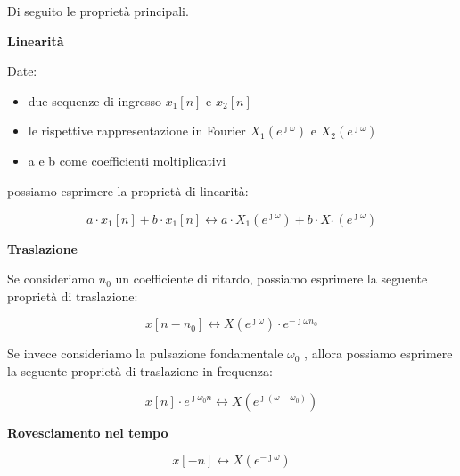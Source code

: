 Di seguito le proprietà principali. \newline 

\textbf{Linearità} \newline

Date: 

\begin{itemize}
    \item due sequenze di ingresso $x_1 \left[ n\right]$ e $x_2 \left[ n\right]$ 
    \item le rispettive rappresentazione in Fourier $X_1 \left(e^{\jmath \omega}\right)$ e $X_2 \left(e^{\jmath \omega}\right)$ 
    \item a e b come coefficienti moltiplicativi  
\end{itemize}

possiamo esprimere la proprietà di linearità: 

{
    \Large 
    \begin{equation}
        a \cdot x_1 \left[ n\right]
        + 
        b \cdot x_1 \left[ n\right]
        \leftrightarrow
        a \cdot X_1 \left(e^{\jmath \omega}\right) 
        +
        b \cdot X_1 \left(e^{\jmath \omega}\right)  
    \end{equation}
}

\textbf{Traslazione} \newline 

Se consideriamo $n_0$ un coefficiente di ritardo, 
possiamo esprimere la seguente proprietà di traslazione: 

{
    \Large 
    \begin{equation}
        x \left[ n - n_0\right]
        \leftrightarrow 
        X \left(e^{\jmath \omega}\right) \cdot e^{- \jmath \omega n_0}
    \end{equation}
}

Se invece consideriamo la pulsazione fondamentale $\omega_0$ , 
allora possiamo esprimere la seguente proprietà di traslazione in frequenza: 

{
    \Large 
    \begin{equation}
        x \left[ n\right] \cdot e^{\jmath \omega_0 n}
        \leftrightarrow 
        X \left(e^{\jmath \left(\omega - \omega_0\right)}\right)
    \end{equation}
}

\textbf{Rovesciamento nel tempo} \newline 

{
    \Large 
    \begin{equation}
        x \left[ -n\right]
        \leftrightarrow
        X \left(e^{- \jmath \omega}\right)
    \end{equation}
}


